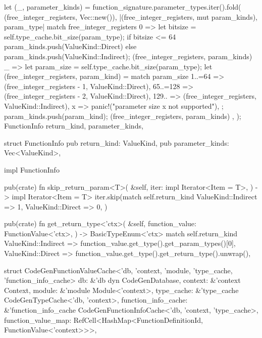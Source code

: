 \documentclass[
  oneside,
  english,
  coorientadorbanca,
  noabntexcite
]{ufsc-thesis-rn46-2019}
\begin{document}
\begin{rustcode}
{{        let (_, parameter_kinds) = function_signature.parameter_types.iter().fold(
            (free_integer_registers, Vec::new()),
            |(free_integer_registers, mut param_kinds), param_type| match free_integer_registers {
                0 => {
                    let bitsize = self.type_cache.bit_size(param_type);
                    if bitsize <= 64 {
                        param_kinds.push(ValueKind::Direct)
                    } else {
                        param_kinds.push(ValueKind::Indirect);
                    }
                    (free_integer_registers, param_kinds)
                }
                _ => {
                    let param_size = self.type_cache.bit_size(param_type);
                    let (free_integer_registers, param_kind) = match param_size {
                        1..=64 => (free_integer_registers - 1, ValueKind::Direct),
                        65..=128 => (free_integer_registers - 2, ValueKind::Direct),
                        129.. => (free_integer_registers, ValueKind::Indirect),
                        x => panic!("parameter size {x} not supported"),
                    };
                    param_kinds.push(param_kind);
                    (free_integer_registers, param_kinds)
                }
            },
        );
        FunctionInfo {
            return_kind,
            parameter_kinds,
        }
    }
}

struct FunctionInfo {
    pub return_kind: ValueKind,
    pub parameter_kinds: Vec<ValueKind>,
}

impl FunctionInfo {
    pub(crate) fn skip_return_param<T>(
        &self,
        iter: impl Iterator<Item = T>,
    ) -> impl Iterator<Item = T> {
        iter.skip(match self.return_kind {
            ValueKind::Indirect => 1,
            ValueKind::Direct => 0,
        })
    }

    pub(crate) fn get_return_type<'ctx>(
        &self,
        function_value: FunctionValue<'ctx>,
    ) -> BasicTypeEnum<'ctx> {
        match self.return_kind {
            ValueKind::Indirect => function_value.get_type().get_param_types()[0],
            ValueKind::Direct => function_value.get_type().get_return_type().unwrap(),
        }
    }
}

struct CodeGenFunctionValueCache<'db, 'context, 'module, 'type_cache, 'function_info_cache> {
    db: &'db dyn CodeGenDatabase,
    context: &'context Context,
    module: &'module Module<'context>,
    type_cache: &'type_cache CodeGenTypeCache<'db, 'context>,
    function_info_cache: &'function_info_cache CodeGenFunctionInfoCache<'db, 'context, 'type_cache>,
    function_value_map: RefCell<HashMap<FunctionDefinitionId, FunctionValue<'context>>>,
}


\end{rustcode}
\end{document}
